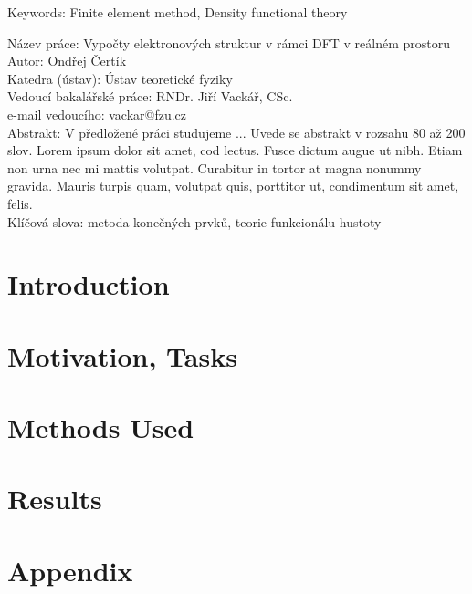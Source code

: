 \documentclass[12pt,notitlepage]{report}
\begin{document}
\noindent Keywords: Finite element method, Density functional theory

\vspace{10mm}

\noindent
Název práce: Vypočty elektronových struktur v rámci DFT v reálném prostoru\\
Autor: Ondřej Čertík\\
Katedra (ústav): Ústav teoretické fyziky\\
Vedoucí bakalářské práce: RNDr. Jiří Vackář, CSc.\\
e-mail vedoucího: vackar@fzu.cz\\

\noindent Abstrakt:  V předložené práci studujeme ... Uvede se abstrakt v rozsahu 80 až 200 slov. Lorem ipsum dolor sit amet, cod lectus. Fusce dictum augue ut nibh. Etiam non urna nec mi mattis volutpat. Curabitur in tortor at magna nonummy gravida. Mauris turpis quam, volutpat quis, porttitor ut, condimentum sit amet, felis.\\

\noindent Klíčová slova: metoda konečných prvků, teorie funkcionálu hustoty

\tableofcontents %

\newpage

\chapter{Introduction}


\chapter{Motivation, Tasks}



\chapter{Methods Used}




\chapter{Results}



\chapter{Appendix}







\end{document}
